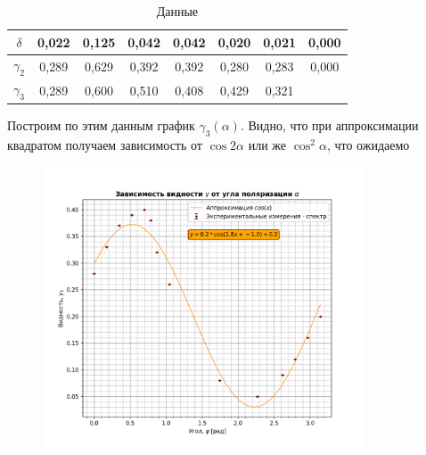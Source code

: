 \documentclass[a4paper, 12pt]{article}
\begin{document}
\begin{table}[H]
\begin{tabular}{|c|c|c|c|c|c|c|c|}
	$\delta$          & 0,022        & 0,125       & 0,042        & 0,042        & 0,020        & 0,021        & 0,000        \\ \hline
	$\gamma_2$        & 0,289        & 0,629       & 0,392        & 0,392        & 0,280        & 0,283        & 0,000        \\ \hline
	$\gamma_3$        & 0,289        & 0,600       & 0,510        & 0,408        & 0,429        & 0,321        &              \\ \hline
	\end{tabular}
	\caption{Данные}
	\label{tab:data}
\end{table}
Построим по этим данным график $\gamma_3(\alpha)$. Видно, что при аппроксимации квадратом получаем зависимость от $\cos 2\alpha$ или же $\cos^2 \alpha$, что ожидаемо

\begin{figure}[H]
    \centering
    \includegraphics[width=0.85\textwidth]{plot4--5--2-3.png}
    \label{fig:plot1}
\end{figure}
\end{document}
